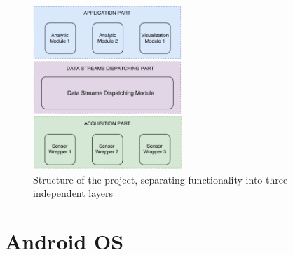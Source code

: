 \begin{figure}
    \centering
    \includegraphics[width=0.5\textwidth]{images/parts.png}
    \caption{Structure of the project, separating functionality into three independent layers \cite{daniel}}
    \label{fig:parts}
\end{figure}






\section{Android OS}

